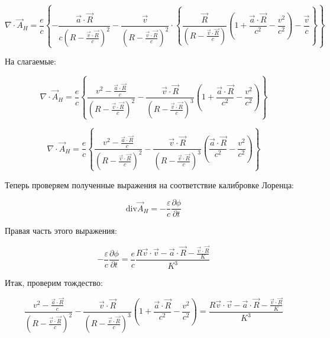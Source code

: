 \documentclass[12pt, a4paper]{article}
\begin{document}
\begin{equation}
\nabla \cdot \vec{A}_H = \frac{e}{c} \left\{ -\frac{\vec{a} \cdot \vec{R}}{c \left( R - \frac{\vec{v} \cdot \vec{R}}{c} \right)^2} - \frac{\vec{v}}{\left( R - \frac{\vec{v} \cdot \vec{R}}{c} \right)^2} \cdot \left\{ \frac{\vec{R}}{\left( R - \frac{\vec{v} \cdot \vec{R}}{c} \right)} \left( 1 + \frac{\vec{a} \cdot \vec{R}}{c^2} - \frac{v^2}{c^2} \right) - \frac{\vec{v}}{c} \right\} \right\}
\label{eq:div_A_expanded}
\end{equation}

На слагаемые:

\begin{equation}
\nabla \cdot \vec{A}_H = \frac{e}{c} \left\{ \frac{v^2 - \frac{\vec{a} \cdot \vec{R}}{c}}{\left( R - \frac{\vec{v} \cdot \vec{R}}{c} \right)^2} - \frac{\vec{v} \cdot \vec{R}}{\left( R - \frac{\vec{v} \cdot \vec{R}}{c} \right)^3} \left( 1 + \frac{\vec{a} \cdot \vec{R}}{c^2} - \frac{v^2}{c^2} \right) \right\}
\label{eq:div_A_expanded2}
\end{equation}

\begin{equation}
\nabla \cdot \vec{A}_H = \frac{e}{c} \left\{ \frac{v^2 - \frac{\vec{a} \cdot \vec{R}}{c}}{\left( R - \frac{\vec{v} \cdot \vec{R}}{c} \right)^2} - \frac{\vec{v} \cdot \vec{R}}{\left( R - \frac{\vec{v} \cdot \vec{R}}{c} \right)^3} \left( \frac{\vec{a} \cdot \vec{R}}{c^2} - \frac{v^2}{c^2} \right) \right\}
\label{eq:div_A_expanded3}
\end{equation}

Теперь проверяем полученные выражения на соответствие калибровке Лоренца:

\begin{equation}
\text{div} \vec{A}_H = -\frac{\varepsilon}{c} \frac{\partial \phi}{\partial t}
\label{eq:lorentz_check}
\end{equation}

Правая часть этого выражения:

\begin{equation}
-\frac{\varepsilon}{c} \frac{\partial \phi}{\partial t} = \frac{e}{c} \frac{R \vec{v} \cdot \vec{v} - \vec{a} \cdot \vec{R} - \frac{\vec{v} \cdot \vec{R}}{K}}{K^3}
\label{eq:lorentz_rhs}
\end{equation}

Итак, проверим тождество:

\begin{equation}
\frac{v^2 - \frac{\vec{a} \cdot \vec{R}}{c}}{\left( R - \frac{\vec{v} \cdot \vec{R}}{c} \right)^2} - \frac{\vec{v} \cdot \vec{R}}{\left( R - \frac{\vec{v} \cdot \vec{R}}{c} \right)^3} \left( 1 + \frac{\vec{a} \cdot \vec{R}}{c^2} - \frac{v^2}{c^2} \right) = \frac{R \vec{v} \cdot \vec{v} - \vec{a} \cdot \vec{R} - \frac{\vec{v} \cdot \vec{R}}{K}}{K^3}
\label{eq:identity_check}
\end{equation}
\end{document}
